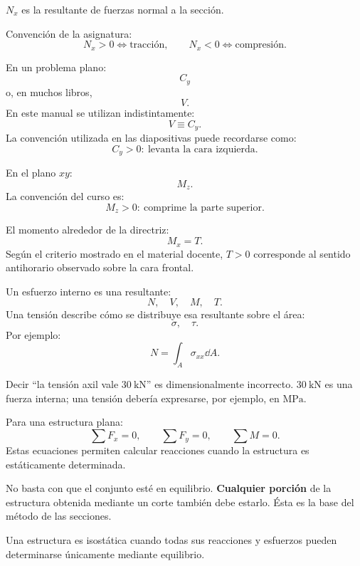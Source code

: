 $N_x$ es la resultante de fuerzas normal a la sección.

Convención de la asignatura:
\[
N_x>0\Longleftrightarrow\text{tracción},
\qquad
N_x<0\Longleftrightarrow\text{compresión}.
\]

En un problema plano:
\[
C_y
\]
o, en muchos libros,
\[
V.
\]
En este manual se utilizan indistintamente:
\[
V\equiv C_y.
\]
La convención utilizada en las diapositivas puede recordarse como:
\[
C_y>0:\ \text{levanta la cara izquierda}.
\]

En el plano $xy$:
\[
M_z.
\]
La convención del curso es:
\[
M_z>0:\ \text{comprime la parte superior}.
\]

El momento alrededor de la directriz:
\[
M_x=T.
\]
Según el criterio mostrado en el material docente, $T>0$ corresponde al sentido antihorario observado sobre la cara frontal.

Un esfuerzo interno es una resultante:
\[
N,\quad V,\quad M,\quad T.
\]
Una tensión describe cómo se distribuye esa resultante sobre el área:
\[
\sigma,\quad\tau.
\]
Por ejemplo:
\[
N=\int_A\sigma_{xx}\dd A.
\]


\begin{errorbox}
Decir ``la tensión axil vale $30\ \mathrm{kN}$'' es dimensionalmente incorrecto. $30\ \mathrm{kN}$ es una fuerza interna; una tensión debería expresarse, por ejemplo, en $\mathrm{MPa}$.
\end{errorbox}


Para una estructura plana:
\[
\sum F_x=0,\qquad
\sum F_y=0,\qquad
\sum M=0.
\]
Estas ecuaciones permiten calcular reacciones cuando la estructura es estáticamente determinada.

No basta con que el conjunto esté en equilibrio. \textbf{Cualquier porción} de la estructura obtenida mediante un corte también debe estarlo. Ésta es la base del método de las secciones.

Una estructura es isostática cuando todas sus reacciones y esfuerzos pueden determinarse únicamente mediante equilibrio.

